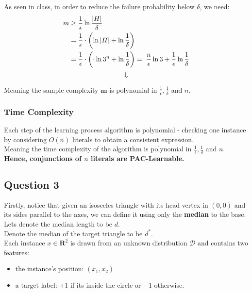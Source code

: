 \documentclass{article}
\begin{document}
	\noindent
	As seen in class, in order to reduce the failure probability below {$\delta$}, we need:
	\begin{align*}
		m & \geq \frac{1}{\epsilon}\ln{\frac{|H|}{\delta}}\\
		& = \frac{1}{\epsilon}\cdot \left(\ln{|H|} + \ln{\frac{1}{\delta}}\right)\\
		& = \frac{1}{\epsilon}\cdot \left(\cdot\ln{3^n} + \ln{\frac{1}{\delta}}\right) = \thickspace \frac{n}{\epsilon}\ln{3} + \frac{1}{\epsilon}\ln{\frac{1}{\delta}}
	\end{align*}
	$${\Downarrow}$$
	\begin{center}
		Meaning the sample complexity ${\textbf{m}}$ is polynomial in ${\frac{1}{\epsilon}, \frac{1}{\delta}}$ and ${n}$.
	\end{center}

	\subsubsection*{Time Complexity}
	Each step of the learning process algorithm is polynomial - checking one instance by considering ${O(n)}$ literals to obtain a consistent expression.\\
	
	\noindent
	Meaning the time complexity of the algorithm is polynomial in ${\frac{1}{\epsilon}, \frac{1}{\delta}}$ and ${n}$.\\

	\noindent
	\textbf{Hence, conjunctions of ${n}$ literals are PAC-Learnable.} \qedsymbol
	
	
	\newpage
	\subsection*{Question 3}
	
	Firstly, notice that given an isosceles triangle with its head vertex in ${(0,0)}$ and its sides parallel to the axes, we can define it using only the \textbf{median} to the base.\\
	
	\noindent
	Lets denote the median length to be ${d}$.\\
	Denote the median of the target triangle to be ${d^*}$.\\
	Each instance ${x \in \mathbf{R}^2}$ is drawn from an unknown distribution ${\mathcal{D}}$ and contains two features:
	\begin{itemize}
		\item the instance's position: ${(x_1,x_2)}$
		\item a target label: ${+1}$ if its inside the circle or ${-1}$ otherwise.
	\end{itemize}
\end{document}
